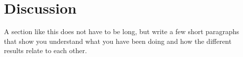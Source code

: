 \section{Discussion}\label{sec:discussion}
A section like this does not have to be long, but write a few short paragraphs that show you understand what you have been doing and how the different results relate to each other.